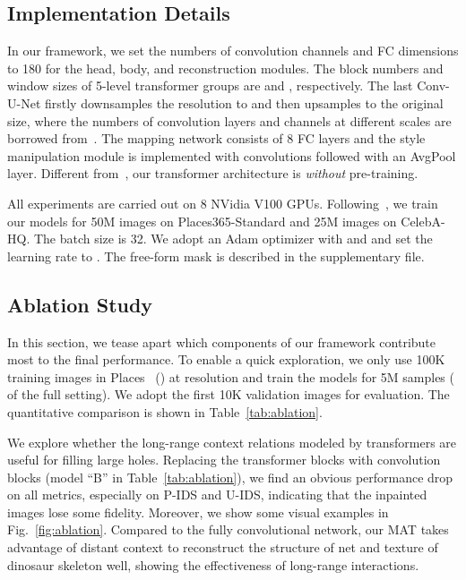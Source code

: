 \documentclass[10pt,twocolumn,letterpaper]{article}
\begin{document}
	\subsection{Implementation Details}
	
	In our framework, we set the numbers of convolution channels and FC dimensions to 180 for the head, body, and reconstruction modules. The block numbers and window sizes of 5-level transformer groups are   and , respectively. The last Conv-U-Net firstly downsamples the resolution to  and then upsamples to the original size, where the numbers of convolution layers and channels at different scales are borrowed from~\cite{karras2020analyzing}. The mapping network consists of 8 FC layers and the style manipulation module is implemented with convolutions followed with an AvgPool layer. Different from~\cite{wan2021high,zheng2021tfill,yu2021diverse}, our transformer architecture is \textit{without} pre-training.
	
	All experiments are carried out on 8 NVidia V100 GPUs. Following~\cite{zhao2020large}, we train our models for 50M images on Places365-Standard and 25M images on CelebA-HQ. The batch size is 32. We adopt an Adam optimizer with  and  and set the learning rate to . The free-form mask is described in the supplementary file. 

	
	\subsection{Ablation Study}
	\label{sec:abl}
	In this section, we tease apart which components of our framework contribute most to the final performance. To enable a quick exploration, we only use 100K training images in Places~\cite{zhou2017places} () at  resolution and train the models for 5M samples ( of the full setting). We adopt the first 10K validation images for evaluation. The quantitative comparison is shown in Table~\ref{tab:ablation}.
	


	\vspace{0.05in}
	 We explore whether the long-range context relations modeled by transformers are useful for filling large holes. Replacing the transformer blocks with convolution blocks (model ``B'' in Table~\ref{tab:ablation}), we find an obvious performance drop on all metrics, especially on P-IDS and U-IDS, indicating that the inpainted images lose some fidelity. Moreover, we show some visual examples in Fig.~\ref{fig:ablation}. Compared to the fully convolutional network, our MAT takes advantage of distant context to reconstruct the structure of net and texture of dinosaur skeleton well, showing the effectiveness of long-range interactions.
	
\end{document}
